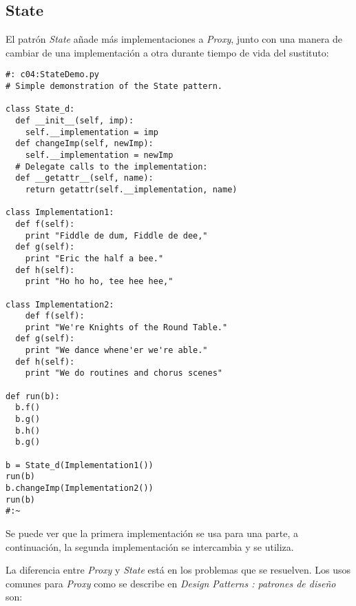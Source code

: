 \newpage

\subsection*{State}
\label{subsec:State}

El patrón \textit{State} añade más implementaciones a \textit{Proxy}, junto con una manera de cambiar de una implementación a otra durante tiempo de vida del sustituto: \newline

\begin{lstlisting} 
#: c04:StateDemo.py 
# Simple demonstration of the State pattern.

class State_d: 
  def __init__(self, imp):  
    self.__implementation = imp  
  def changeImp(self, newImp): 
    self.__implementation = newImp 
  # Delegate calls to the implementation: 
  def __getattr__(self, name): 
    return getattr(self.__implementation, name) 
    
class Implementation1: 
  def f(self):  
    print "Fiddle de dum, Fiddle de dee,"  
  def g(self):  
    print "Eric the half a bee."  
  def h(self):  
    print "Ho ho ho, tee hee hee,"  
    
class Implementation2: 
    def f(self):  
    print "We're Knights of the Round Table."  
  def g(self):  
    print "We dance whene'er we're able."  
  def h(self):  
    print "We do routines and chorus scenes"  
    
def run(b): 
  b.f() 
  b.g() 
  b.h() 
  b.g() 
  
b = State_d(Implementation1()) 
run(b) 
b.changeImp(Implementation2()) 
run(b) 
#:~ 
\end{lstlisting}

Se puede ver que la primera implementación se usa para una parte, a continuación, la segunda implementación se intercambia y se utiliza.     \newline

La diferencia entre \textit{Proxy} y \textit{State} está en los problemas que se resuelven. Los usos comunes para \textit{Proxy} como se describe en \textit{Design Patterns : patrones de diseño} son:

